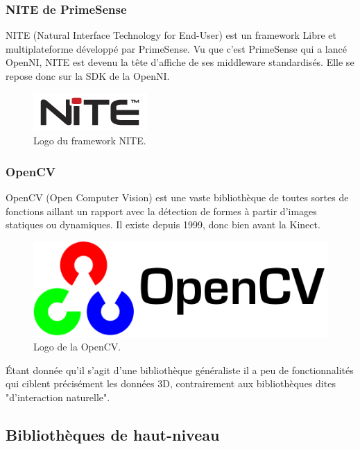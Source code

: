 \subsubsection{NITE de PrimeSense}
NITE (Natural Interface Technology for End-User) est un framework Libre et 
multiplateforme développé par PrimeSense. Vu que c'est PrimeSense qui a 
lancé OpenNI, NITE est devenu la tête d'affiche de ses
middleware standardisés. Elle se repose donc sur la SDK de la OpenNI. 
\begin{figure}[h!]
\centering
\includegraphics[width=0.3\linewidth]{images/nite_logo}
\caption{Logo du framework NITE.}
\end{figure}

\subsubsection{OpenCV}
OpenCV (Open Computer Vision) est une vaste bibliothèque de toutes sortes de 
fonctions aillant un rapport avec la détection de formes à partir d'images
statiques ou dynamiques. Il existe depuis 1999, donc bien avant la Kinect.
\begin{figure}[h!]
\centering
\includegraphics[width=0.4\linewidth]{images/opencv_logo}
\caption{Logo de la OpenCV.}
\end{figure}
Étant donnée qu'il s'agit d'une bibliothèque généraliste il a peu de 
fonctionnalités qui ciblent précisément les données 3D, contrairement aux 
bibliothèques dites "d'interaction naturelle".


\subsection{Bibliothèques de haut-niveau}

